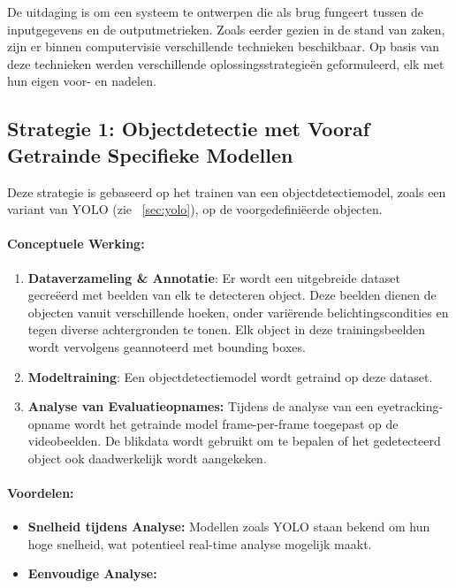 De uitdaging is om een systeem te ontwerpen die als brug fungeert tussen de inputgegevens en de outputmetrieken.
Zoals eerder gezien in de stand van zaken, zijn er binnen computervisie verschillende technieken beschikbaar.
Op basis van deze technieken werden verschillende oplossingsstrategieën geformuleerd, elk met hun eigen voor- en nadelen.

\subsection{Strategie 1: Objectdetectie met Vooraf Getrainde Specifieke Modellen}

Deze strategie is gebaseerd op het trainen van een objectdetectiemodel, zoals een variant van YOLO (zie ~\ref{sec:yolo}), 
op de voorgedefiniëerde objecten.

\paragraph{Conceptuele Werking:}
\begin{enumerate}
    \item \textbf{Dataverzameling \& Annotatie}: Er wordt een uitgebreide dataset gecreëerd met beelden van elk te detecteren object. 
    Deze beelden dienen de objecten vanuit verschillende hoeken, onder variërende belichtingscondities en tegen diverse achtergronden te tonen. 
    Elk object in deze trainingsbeelden wordt vervolgens geannoteerd met bounding boxes.
    \item \textbf{Modeltraining}: Een objectdetectiemodel wordt getraind op deze dataset.
    \item \textbf{Analyse van Evaluatieopnames:} Tijdens de analyse van een eyetracking-opname wordt het getrainde model frame-per-frame 
    toegepast op de videobeelden. 
    De blikdata wordt gebruikt om te bepalen of het gedetecteerd object ook daadwerkelijk wordt aangekeken.
\end{enumerate}

\paragraph{Voordelen:}
\begin{itemize}
    \item \textbf{Snelheid tijdens Analyse:} Modellen zoals YOLO staan bekend om hun hoge snelheid, wat potentieel real-time analyse mogelijk maakt.
    \item \textbf{Eenvoudige Analyse:} %
\end{itemize}




